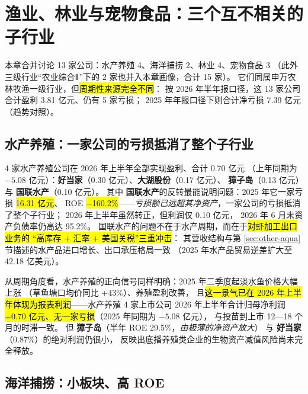 \section{渔业、林业与宠物食品：三个互不相关的子行业}
\label{sec:fishery}

本章合并讨论 \num{13} 家公司：水产养殖 \num{4}、海洋捕捞 \num{2}、林业 \num{4}、宠物食品 \num{3}
（此外三级行业“农业综合Ⅱ”下的 \num{2} 家也并入本章画像，合计 \num{15} 家）。
它们同属申万农林牧渔一级行业，但\hl{周期性来源完全不同}：
按 2026 年半年报口径，这 \num{13} 家公司合计盈利 \num{3.81} 亿元、仍有 \num{5} 家亏损；
2025 年年报口径下则合计净亏损 \num{7.39} 亿元（趋势对照）。



\subsection{水产养殖：一家公司的亏损抵消了整个子行业}
\label{sec:fishery-aqua}

\num{4} 家水产养殖公司在 2026 年上半年全部实现盈利、合计 \num{0.70} 亿元
（上年同期为 $-5.08$ 亿元）：\textbf{好当家}（\num{0.30} 亿元）、\textbf{大湖股份}（\num{0.17} 亿元）、
\textbf{獐子岛}（\num{0.13} 亿元）与 \textbf{国联水产}（\num{0.10} 亿元）。
其中 \textbf{国联水产}的反转最能说明问题：2025 年它一家亏损 \hl{\num{16.31} 亿元}、
ROE \hl{\num{-160.2}\%}——\emph{亏损额已远超其净资产}，一家公司的亏损抵消了整个子行业；
2026 年上半年虽然转正，但利润仅 \num{0.10} 亿元，
2026 年 6 月末资产负债率仍高达 \num{95.2}\%。
国联水产的问题不在于水产周期，而在于\hl{对虾加工出口业务的
“高库存 + 汇率 + 美国关税”三重冲击}：
其营收结构与第 \ref{sec:other-aqua} 节描述的水产品进口增长、出口承压格局一致
（2025 年水产品贸易逆差扩大至 \num{42.18} 亿美元）。

从周期角度看，水产养殖的正向信号同样明确：2025 年二季度起淡水鱼价格大幅上涨
（草鱼塘口均价同比 +$43\%$）、养殖盈利改善，
且\hl{这一景气已在 2026 年上半年体现为报表利润}——水产养殖 \num{4} 家上市公司
2026 年上半年合计归母净利润 \hl{$+0.70$ 亿元、无一家亏损}（2025 年同期为 $-5.08$ 亿元），
与投苗到上市 \num{12}---\num{18} 个月的时滞一致。
但 \textbf{獐子岛}（半年 ROE \num{29.5}\%，\emph{由极薄的净资产放大}）
与 \textbf{好当家}（\num{0.87}\%）的绝对利润仍很小，
反映出底播养殖类企业的生物资产减值风险尚未完全释放。

\subsection{海洋捕捞：小板块、高 ROE}
\label{sec:fishery-marine}

